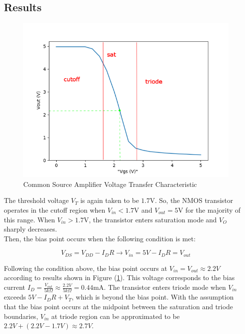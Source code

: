 \subsection{Results}

\FloatBarrier

\begin{figure}[h!]
	\centering
	\includegraphics[scale=0.50]{./data/common_source_edited.png}
	\caption{Common Source Amplifier Voltage Transfer Characteristic}
	\label{fig:common_source}
\end{figure}

\FloatBarrier

The threshold voltage $V_T$ is again taken to be $1.7$\si{\volt}.
So, the NMOS transistor operates in the cutoff region when $V_{in} < 1.7$\si{\volt} and $V_{out} = 5$\si{\volt} for the majority of this range.
When $V_{in} > 1.7$\si{\volt}, the transistor enters saturation mode and $V_{O}$ sharply decreases. \\
Then, the bias point occurs when the following condition is met:

\begin{equation}
	\label{eq:bias_nmos_csa}
	V_{DS} = V_{DD} - I_{D}R \rightarrow V_{in} = 5V - I_{D}R = V_{out}
\end{equation}

Following the condition above, the bias point occurs at $V_{in} = V_{out} \approx 2.2V$ according to results shown in Figure (\ref{fig:common_source}).
This voltage corresponds to the bias current $I_{D} = \frac{V_{out}}{5k\Omega} \approx \frac{2.2V}{5k\Omega} = 0.44$\si{\milli\ampere}.
The transistor enters triode mode when $V_{in}$ exceeds $5V - I_{D}R + V_T$, which is beyond the bias point.
With the assumption that the bias point occurs at the midpoint between the saturation and triode boundaries, $V_{in}$ at triode region can be approximated to be $2.2V + (2.2V - 1.7V) \approx 2.7V$.

